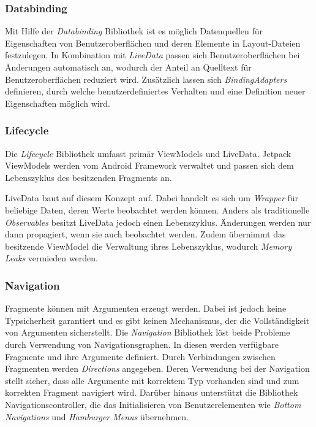 \documentclass[a4paper, 11pt]{article}
\begin{document}
\subsubsection{Databinding}
\label{subsubsec:app:jetpack:databinding}
Mit Hilfe der \textit{Databinding} Bibliothek ist es möglich Datenquellen für Eigenschaften von Benutzeroberflächen und deren Elemente in Layout-Dateien festzulegen.
In Kombination mit \textit{LiveData} passen sich Benutzeroberflächen bei Änderungen automatisch an, wodurch der Anteil an Quelltext für Benutzeroberflächen reduziert wird.
Zusätzlich lassen sich \textit{BindingAdapters} definieren, durch welche benutzerdefiniertes Verhalten und eine Definition neuer Eigenschaften möglich wird.

\subsubsection{Lifecycle}
\label{subsubsec:app:jetpack:lifecycle}
Die \textit{Lifecycle} Bibliothek umfasst primär ViewModels und LiveData.
Jetpack ViewModels werden vom Android Framework verwaltet und passen sich dem Lebenszyklus des besitzenden Fragments an.

LiveData baut auf diesem Konzept auf.
Dabei handelt es sich um \textit{Wrapper} für beliebige Daten, deren Werte beobachtet werden können.
Anders als traditionelle \textit{Observables} besitzt LiveData jedoch einen Lebenszyklus.
Änderungen werden nur dann propagiert, wenn sie auch beobachtet werden.
Zudem übernimmt das besitzende ViewModel die Verwaltung ihres Lebenszyklus, wodurch \textit{Memory Leaks} vermieden werden.

\subsubsection{Navigation}
\label{subsubsec:app:jetpack:navigation}
Fragmente können mit Argumenten erzeugt werden.
Dabei ist jedoch keine Typsicherheit garantiert und es gibt keinen Mechanismus, der die Vollständigkeit von Argumenten sicherstellt.
Die \textit{Navigation} Bibliothek löst beide Probleme durch Verwendung von Navigationsgraphen.
In diesen werden verfügbare Fragmente und ihre Argumente definiert.
Durch Verbindungen zwischen Fragmenten werden \textit{Directions} angegeben.
Deren Verwendung bei der Navigation stellt sicher, dass alle Argumente mit korrektem Typ vorhanden sind und zum korrekten Fragment navigiert wird.
Darüber hinaus unterstützt die Bibliothek Navigationscontroller, die das Initialisieren von Benutzerelementen wie \textit{Bottom Navigations} und \textit{Hamburger Menus} übernehmen. 
\end{document}
